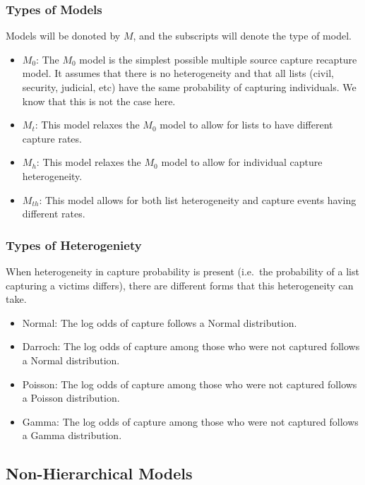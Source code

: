 \documentclass[]{article}
\providecommand{\tightlist}{%
  \setlength{\itemsep}{0pt}\setlength{\parskip}{0pt}}
\begin{document}
\hypertarget{types-of-models}{%
\subsubsection{Types of Models}\label{types-of-models}}

Models will be donoted by \(M\), and the subscripts will denote the type
of model.

\begin{itemize}
\tightlist
\item
  \(M_0\): The \(M_0\) model is the simplest possible multiple source
  capture recapture model. It assumes that there is no heterogeneity and
  that all lists (civil, security, judicial, etc) have the same
  probability of capturing individuals. We know that this is not the
  case here.
\item
  \(M_t\): This model relaxes the \(M_0\) model to allow for lists to
  have different capture rates.
\item
  \(M_h\): This model relaxes the \(M_0\) model to allow for individual
  capture heterogeneity.
\item
  \(M_{th}\): This model allows for both list heterogeneity and capture
  events having different rates.
\end{itemize}

\hypertarget{types-of-heterogeniety}{%
\subsubsection{Types of Heterogeniety}\label{types-of-heterogeniety}}

When heterogeneity in capture probability is present (i.e.~the
probability of a list capturing a victims differs), there are different
forms that this heterogeneity can take.

\begin{itemize}
\tightlist
\item
  Normal: The log odds of capture follows a Normal distribution.
\item
  Darroch: The log odds of capture among those who were not captured
  follows a Normal distribution.
\item
  Poisson: The log odds of capture among those who were not captured
  follows a Poisson distribution.
\item
  Gamma: The log odds of capture among those who were not captured
  follows a Gamma distribution.
\end{itemize}

\hypertarget{non-hierarchical-models}{%
\subsection{Non-Hierarchical Models}\label{non-hierarchical-models}}
\end{document}

